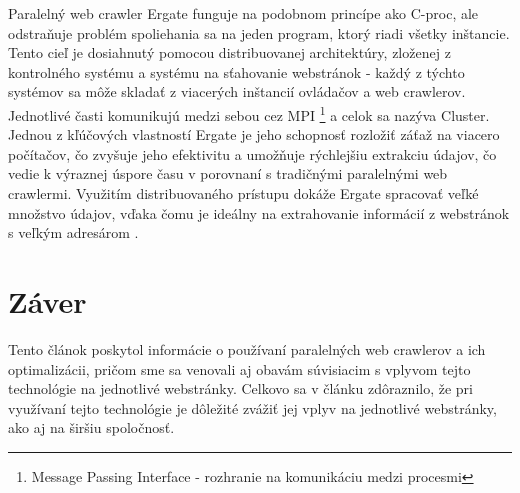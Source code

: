 \documentclass[10pt,twoside,slovak,a4paper]{article}
\begin{document}
Paralelný web crawler Ergate funguje na podobnom princípe ako C-proc, ale odstraňuje problém spoliehania sa na jeden program, ktorý riadi všetky inštancie. Tento cieľ je dosiahnutý pomocou distribuovanej architektúry, zloženej z kontrolného systému a systému na sťahovanie webstránok - každý z týchto systémov sa môže skladať z viacerých inštancií ovládačov a web crawlerov. Jednotlivé časti komunikujú medzi sebou cez MPI \footnote{Message Passing Interface - rozhranie na komunikáciu medzi procesmi} a celok sa nazýva Cluster. Jednou z kľúčových vlastností Ergate je jeho schopnosť rozložiť záťaž na viacero počítačov, čo zvyšuje jeho efektivitu a umožňuje rýchlejšiu extrakciu údajov, čo vedie k výraznej úspore času v porovnaní s tradičnými paralelnými web crawlermi. Využitím distribuovaného prístupu dokáže Ergate spracovať veľké množstvo údajov, vďaka čomu je ideálny na extrahovanie informácií z webstránok s veľkým adresárom \cite{5709184}.

\section{Záver}

Tento článok poskytol informácie o používaní paralelných web crawlerov a ich optimalizácii, pričom sme sa venovali aj obavám súvisiacim s vplyvom tejto technológie na jednotlivé webstránky. Celkovo sa v článku zdôraznilo, že pri využívaní tejto technológie je dôležité zvážiť jej vplyv na jednotlivé webstránky, ako aj na širšiu spoločnosť.

\newpage



\end{document}
